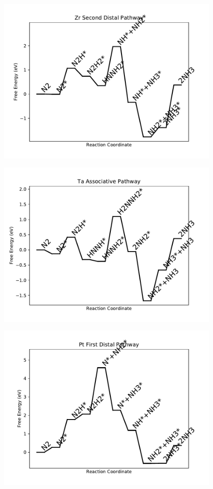 \begin{figure}
\centering
\includegraphics[width=0.8\linewidth]{data/plots/Zr_distal_2.pdf}
\end{figure}

\begin{figure}
\centering
\includegraphics[width=0.8\linewidth]{data/plots/Ta_associative.pdf}
\end{figure}

\begin{figure}
\centering
\includegraphics[width=0.8\linewidth]{data/plots/Pt_distal_1.pdf}
\end{figure}

